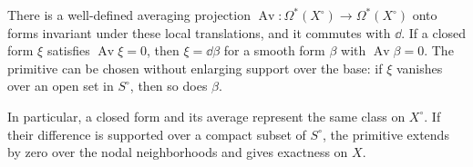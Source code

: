 \begin{lemma}\label{lem:regular-averaging}
There is a well-defined averaging projection
$\operatorname{Av}\colon\Omega^*(X^\circ)\to\Omega^*(X^\circ)$ onto
forms invariant under these local translations, and it commutes with
$\dd$.  If a closed form $\xi$ satisfies $\operatorname{Av}\xi=0$, then
$\xi=\dd\beta$ for a smooth form $\beta$ with
$\operatorname{Av}\beta=0$.  The primitive can be chosen without
enlarging support over the base: if $\xi$ vanishes over an open set in
$S^\circ$, then so does $\beta$.

In particular, a closed form and its average represent the same class
on $X^\circ$.  If their difference is supported over a compact subset
of $S^\circ$, the primitive extends by zero over the nodal neighborhoods
and gives exactness on $X$.
\end{lemma}


